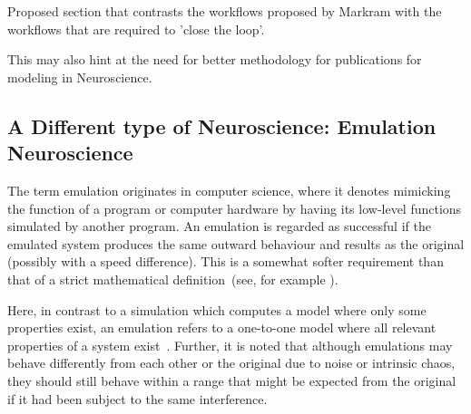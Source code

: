 \documentclass[10pt,letterpaper]{article}
\begin{document}
Proposed section that contrasts the workflows proposed by Markram with the workflows that are required to 'close the loop'.

This may also hint at the need for better methodology for publications for modeling in Neuroscience.



\subsection*{A Different type of Neuroscience: Emulation Neuroscience}
\label{subsection:emuneuro}


The term emulation originates in computer science, where it denotes mimicking the function of a program or computer hardware by having its low-level functions simulated by another program. An emulation is regarded as successful if the emulated system produces the same outward behaviour and results as the original (possibly with a speed difference). This is a somewhat softer requirement than that of a strict mathematical definition~(see, for example \cite{sandberg08}).


Here, in contrast to a simulation which computes a model where only some properties exist, an emulation refers to a one-to-one model where all relevant properties of a system exist~\cite{sandberg08}. Further, it is noted that although emulations may behave differently from each other or the original due to noise or intrinsic chaos, they should still behave within a range that might be expected from the original if it had been subject to the same interference.
\end{document}
